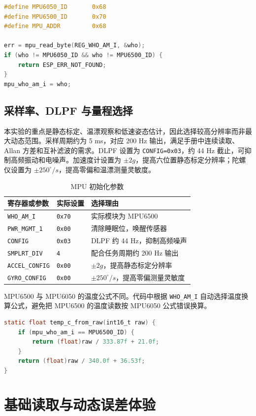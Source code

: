 \documentclass[UTF8,a4paper,12pt]{ctexart}
\newcommand{\code}[1]{\texttt{#1}}
\begin{document}
\begin{lstlisting}[language=C]
#define MPU6050_ID       0x68
#define MPU6500_ID       0x70
#define MPU_ADDR         0x68

err = mpu_read_byte(REG_WHO_AM_I, &who);
if (who != MPU6050_ID && who != MPU6500_ID) {
    return ESP_ERR_NOT_FOUND;
}
mpu_who_am_i = who;
\end{lstlisting}

\subsection{采样率、DLPF 与量程选择}
本实验的重点是静态标定、温漂观察和低速姿态估计，因此选择较高分辨率而非最大动态范围。采样周期约为 5 ms，对应 200 Hz 输出，满足手册中连续读取、Allan 方差和互补滤波的需求。DLPF 设置为 \code{CONFIG=0x03}，约 44 Hz 截止，可抑制高频振动和电噪声。加速度计设置为 \(\pm 2g\)，提高六位置静态标定分辨率；陀螺仪设置为 \(\pm 250^\circ/s\)，提高零偏和温漂测量灵敏度。

\begin{table}[H]
\centering
\caption{MPU 初始化参数}
\begin{tabular}{lll}
\toprule
寄存器或参数 & 实际设置 & 选择理由\\
\midrule
\code{WHO\_AM\_I} & \code{0x70} & 实际模块为 MPU6500\\
\code{PWR\_MGMT\_1} & \code{0x00} & 清除睡眠位，唤醒传感器\\
\code{CONFIG} & \code{0x03} & DLPF 约 44 Hz，抑制高频噪声\\
\code{SMPLRT\_DIV} & \code{4} & 配合任务周期约 200 Hz 输出\\
\code{ACCEL\_CONFIG} & \code{0x00} & \(\pm 2g\)，提高静态标定分辨率\\
\code{GYRO\_CONFIG} & \code{0x00} & \(\pm 250^\circ/s\)，提高零偏测量灵敏度\\
\bottomrule
\end{tabular}
\end{table}

MPU6500 与 MPU6050 的温度公式不同。代码中根据 \code{WHO\_AM\_I} 自动选择温度换算公式，避免把 MPU6500 的温度读数按 MPU6050 公式错误换算。

\begin{lstlisting}[language=C]
static float temp_c_from_raw(int16_t raw) {
    if (mpu_who_am_i == MPU6500_ID) {
        return (float)raw / 333.87f + 21.0f;
    }
    return (float)raw / 340.0f + 36.53f;
}
\end{lstlisting}

\section{基础读取与动态误差体验}
\end{document}
